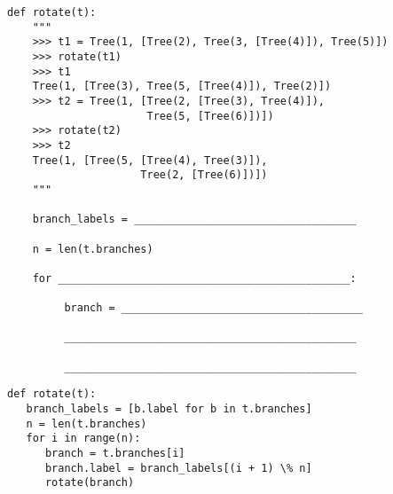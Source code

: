 \begin{blocksection}

\begin{lstlisting}
def rotate(t):
    """
    >>> t1 = Tree(1, [Tree(2), Tree(3, [Tree(4)]), Tree(5)])
    >>> rotate(t1)
    >>> t1
    Tree(1, [Tree(3), Tree(5, [Tree(4)]), Tree(2)])
    >>> t2 = Tree(1, [Tree(2, [Tree(3), Tree(4)]), 
                      Tree(5, [Tree(6)])])
    >>> rotate(t2)
    >>> t2
    Tree(1, [Tree(5, [Tree(4), Tree(3)]), 
                     Tree(2, [Tree(6)])])
    """

    branch_labels = ___________________________________

    n = len(t.branches)

    for ______________________________________________:

         branch = ______________________________________

         ______________________________________________

         ______________________________________________ 
\end{lstlisting}
\end{blocksection}
\begin{blocksection}
\begin{solution}
\begin{lstlisting}
def rotate(t):
   branch_labels = [b.label for b in t.branches]
   n = len(t.branches)
   for i in range(n):
      branch = t.branches[i]
      branch.label = branch_labels[(i + 1) \% n]
      rotate(branch)
\end{lstlisting}
\end{solution}
\end{blocksection}